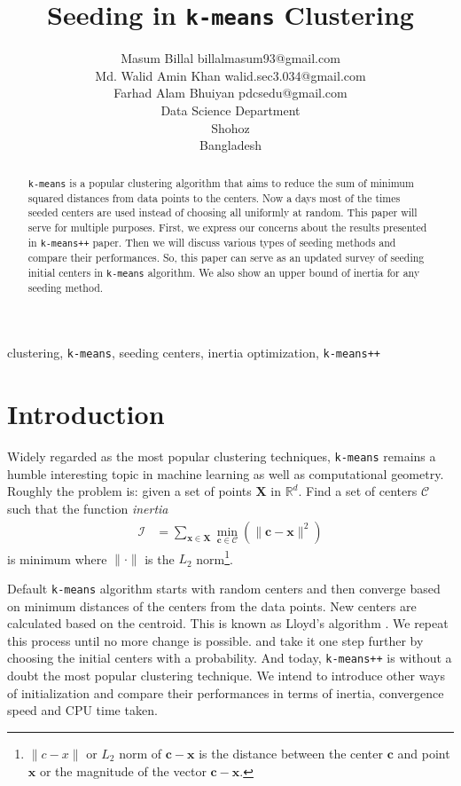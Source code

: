 \documentclass[twoside, 11pt]{article}
\title{Seeding in \texttt{k-means} Clustering}
\author{\name Masum Billal 
	\email billalmasum93@gmail.com\\
	\name Md. Walid Amin Khan
	\email walid.sec3.034@gmail.com\\
	\name Farhad Alam Bhuiyan
	\email pdcsedu@gmail.com\\
	\addr Data Science Department\\
	Shohoz\\
	Bangladesh
}
\newcommand{\x}{\mathbf{x}}
\newcommand{\X}{\mathbf{X}}
\renewcommand{\c}{\mathbf{c}}
\newcommand{\C}{\mathcal{C}}
\begin{document}
	
	\maketitle
		\begin{abstract}%
			\texttt{k-means} is a popular clustering algorithm that aims to reduce the sum of minimum squared distances from data points to the centers. Now a days most of the times seeded centers are used instead of choosing all uniformly at random. This paper will serve for multiple purposes. First, we express our concerns about the results presented in \texttt{k-means++} paper. Then we will discuss various types of seeding methods and compare their performances. So, this paper can serve as an updated survey of seeding initial centers in \texttt{k-means} algorithm. We also show an upper bound of inertia for any seeding method.
		\end{abstract}
	
		\begin{keywords}
			clustering, \texttt{k-means}, seeding centers, inertia optimization, \texttt{k-means++}
		\end{keywords}
	\section{Introduction}
	Widely regarded as the most popular clustering techniques, \texttt{k-means} remains a humble interesting topic in machine learning as well as computational geometry. Roughly the problem is: given a set of points $\X$ in $\mathbb{R}^d$. Find a set of centers $\mathcal{C}$ such that the function \textit{inertia}
		\begin{align*}
			\mathcal{I} & = \sum_{\x\in\X}\min_{\c\in\C}(\|\c-\x\|^2)
		\end{align*}
	is minimum where $\|\cdot\|$ is the $L_2$ norm\footnote{$\|c-x\|$ or $L_2$ norm of $\c-\x$ is the distance between the center $\c$ and point $\x$ or the magnitude of the vector $\c-\x$.}.
	
	Default \texttt{k-means} algorithm starts with random centers and then converge based on minimum distances of the centers from the data points. New centers are calculated based on the centroid. This is known as Lloyd's algorithm \citep{lloyd}. We repeat this process until no more change is possible. \cite{ostrovsky} and \cite{kmeans++} take it one step further by choosing the initial centers with a probability. And today, \texttt{k-means++} is without a doubt the most popular clustering technique. We intend to introduce other ways of initialization and compare their performances in terms of inertia, convergence speed and CPU time taken.
	
\end{document}
